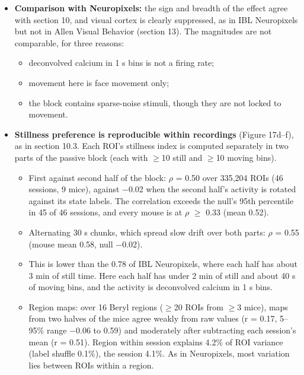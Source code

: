 \documentclass[10pt,a4paper]{article}
\begin{document}
\begin{itemize}
\begin{itemize}
\item RSP is less suppressed than the other imaged ROIs ($-$0.20 against $-$0.41; 9 of 10 sessions);
\item RSP has more still-preferring ROIs (7.3\% against 4.2\%).
\end{itemize}
 Two mice cannot support a core-specific claim. The direction matches the Neuropixels data, where the core is slightly, not significantly, less movement-modulated than other cortex (section 10.6).
\item \textbf{Comparison with Neuropixels:} the sign and breadth of the effect agree with section 10, and visual cortex is clearly suppressed, as in IBL Neuropixels but not in Allen Visual Behavior (section 13). The magnitudes are not comparable, for three reasons: 
\begin{itemize}
\item deconvolved calcium in 1 s bins is not a firing rate;
\item movement here is face movement only;
\item the block contains sparse-noise stimuli, though they are not locked to movement.
\end{itemize}
\item \textbf{Stillness preference is reproducible within recordings} (Figure 17d--f), as in section 10.3. Each ROI's stillness index is computed separately in two parts of the passive block (each with $\geq$10 still and $\geq$10 moving bins). 
\begin{itemize}
\item First against second half of the block: $\rho$ = 0.50 over 335,204 ROIs (46 sessions, 9 mice), against $-$0.02 when the second half's activity is rotated against its state labels. The correlation exceeds the null's 95th percentile in 45 of 46 sessions, and every mouse is at $\rho$ $\geq$ 0.33 (mean 0.52).
\item Alternating 30 s chunks, which spread slow drift over both parts: $\rho$ = 0.55 (mouse mean 0.58, null $-$0.02).
\item This is lower than the 0.78 of IBL Neuropixels, where each half has about 3 min of still time. Here each half has under 2 min of still and about 40 s of moving bins, and the activity is deconvolved calcium in 1 s bins.
\item Region maps: over 16 Beryl regions ($\geq$20 ROIs from $\geq$3 mice), maps from two halves of the mice agree weakly from raw values (r = 0.17, 5--95\% range $-$0.06 to 0.59) and moderately after subtracting each session's mean (r = 0.51). Region within session explains 4.2\% of ROI variance (label shuffle 0.1\%), the session 4.1\%. As in Neuropixels, most variation lies between ROIs within a region.

\end{itemize}
\end{itemize}
\end{document}
